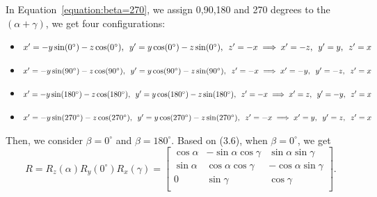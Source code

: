 In Equation~\ref{equation:beta=270}, we assign 0,90,180 and 270 degrees to the $(\alpha+\gamma)$, we get four configurations:
\begin{itemize}
  \item  $x'=-y\sin(0^{\circ})-z\cos(0^{\circ}),\hspace{5pt} y'=y\cos(0^{\circ})-z\sin(0^{\circ}),\hspace{5pt} z'=-x \\\implies x'=-z,\hspace{5pt} y'=y,\hspace{5pt} z'=x$
  \item  $x'=-y\sin(90^{\circ})-z\cos(90^{\circ}),\hspace{5pt} y'=y\cos(90^{\circ})-z\sin(90^{\circ}),\hspace{5pt} z'=-x\\\implies x'=-y,\hspace{5pt} y'=-z,\hspace{5pt} z'=x$
  \item  $x'=-y\sin(180^{\circ})-z\cos(180^{\circ}),\hspace{5pt} y'=y\cos(180^{\circ})-z\sin(180^{\circ}),\hspace{5pt} z'=-x\\\implies x'=z,\hspace{5pt} y'=-y,\hspace{5pt} z'=x$
  \item  $x'=-y\sin(270^{\circ})-z\cos(270^{\circ}),\hspace{5pt} y'=y\cos(270^{\circ})-z\sin(270^{\circ}),\hspace{5pt} z'=-x\\\implies x'=y, \hspace{5pt}y'=z,\hspace{5pt} z'=x$
  \label{3Drotation24situations2}
\end{itemize}
Then, we consider  $\beta=0^{\circ}$ and $\beta=180^{\circ}$. Based on (3.6), when $\beta=0^{\circ}$, we get
\begin{equation}
\label{equation:beta=0}
R=R_{z}(\alpha)R_{y}(0^{\circ})R_{x}(\gamma)=
\begin{bmatrix}
\cos\alpha&-\sin\alpha\cos\gamma&\sin\alpha\sin\gamma\\
\sin\alpha&\cos\alpha\cos\gamma&-\cos\alpha\sin\gamma\\
0&          \sin\gamma&\cos\gamma\\
\end{bmatrix}.
\end{equation}
